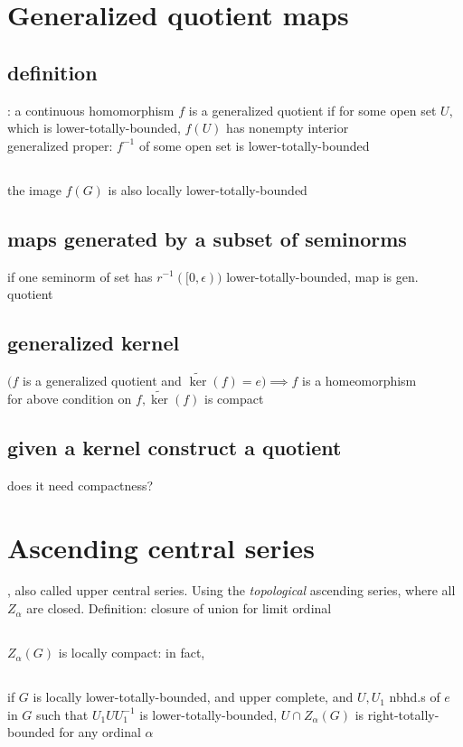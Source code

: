 \documentclass[a4paper]{article}
\newcommand{\complete}[1]{\widetilde{#1}}
\newcommand{\inv }{^{-1}}
\begin{document}
\section{Generalized quotient maps}
\subsection{definition}: a continuous homomorphism $f$ is a generalized quotient if for some open set $U$, which is lower-totally-bounded, $f(U)$ has nonempty interior
\\ generalized proper: $f\inv $ of some open set is lower-totally-bounded
\subsection{} the image $f(G)$ is also locally lower-totally-bounded
\subsection{maps generated by a subset of seminorms}
%
%
if one seminorm of set has $r\inv ([0,\epsilon))$ lower-totally-bounded, map is gen. quotient\textit{}
\subsection{generalized kernel }
$(f$ is a generalized quotient and $\complete{\ker}(f)={e})\implies f$ is a homeomorphism
\\for above condition on $f, \complete{\ker}(f)$ is compact
\subsection{given a kernel construct a quotient}
does it need compactness?
\section{ Ascending central series}, also called upper central series.
Using the \textit{topological} ascending series, where all $Z_\alpha$ are closed. Definition: closure of union for limit ordinal
\subsection{} $ Z_\alpha(G)$ is locally compact: in fact, 
\subsection{} if $G $ is locally lower-totally-bounded, and upper complete, and $U,U_1$  nbhd.s of $e$ in $G$ such that $U_1 U U_1\inv $ is lower-totally-bounded, $U\cap Z_\alpha(G) $ is right-totally-bounded for any ordinal $\alpha$
\end{document}
